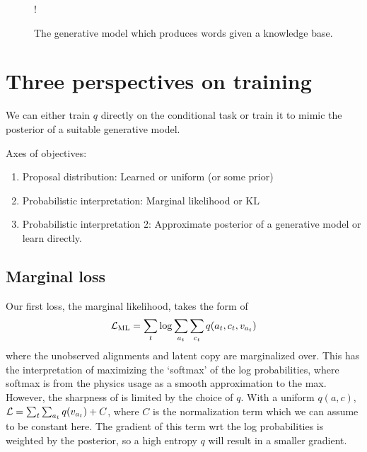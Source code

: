 \documentclass[12pt]{article}
\begin{document}
\begin{figure}[t]
\begin{center}
\resizebox {.3\columnwidth} {!} {
} %
\end{center}
\caption{The generative model which produces words given a knowledge base.}
\label{fig:genmodel}
\end{figure}


\section{Three perspectives on training}
We can either train $q$ directly on the conditional task
or train it to mimic the posterior of a suitable generative model.

Axes of objectives:
\begin{enumerate}
\item Proposal distribution: Learned or uniform (or some prior)
\item Probabilistic interpretation: Marginal likelihood or KL
\item Probabilistic interpretation 2: Approximate posterior
    of a generative model or learn directly.
\end{enumerate}

\subsection{Marginal loss}
Our first loss, the marginal likelihood, takes the form of
$$\mathcal{L}_{\textrm{ML}} = \sum_t \log \sum_{a_t} \sum_{c_t} q(a_t,c_t,v_{a_t})$$
where the unobserved alignments and latent copy are marginalized over.
This has the interpretation of maximizing the `softmax' of the 
log probabilities, where softmax is from the physics usage
as a smooth approximation to the max.
However, the sharpness of is limited by the choice of $q$.
With a uniform $q(a,c)$, $\mathcal{L} = \sum_t \sum_{a_t}q(v_{a_t}) + C$,
where $C$ is the normalization term which we can assume to be constant here.
The gradient of this term wrt the log probabilities is weighted by the posterior,
so a high entropy $q$ will result in a smaller gradient.
\end{document}
